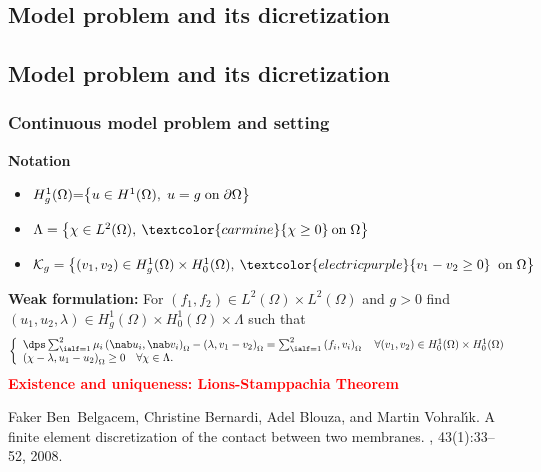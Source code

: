 \documentclass[10 pt]{beamer}
\begin{document}
\begin{frame}
\section{Model problem and its dicretization}
\subsection{Model problem and its dicretization}  
\frametitle{Continuous model problem and setting}
\textbf{Notation}
\begin{itemize}
\item $H_g^1(\Omega)\hspace{-0.1 cm} =\hspace{-0.1 cm} \left\{u\in H^1(\Omega), \hspace{0.1 cm} u=g \hspace{0.1 cm} \mbox{on} \hspace{0.1 cm} \partial \Omega\right\}$
\item $\Lambda=\left\{\chi\in L^2(\Omega), \: \textcolor{carmine}{\chi \geq 0} \: \mbox{on} \hspace{0.1 cm} \Omega\right\}$
\item
$\mathcal{K}_g= \left\{(v_1,v_2)\in H_g^1(\Omega)\times H_0^1(\Omega),\: \textcolor{electricpurple}{v_1-v_2 \geq 0} \; \; \mbox{on} 
\hspace{0.1 cm} \Omega \right\}$
\end{itemize}
\textbf{Weak formulation:}
For $(f_1,f_2)\in L^2(\Omega)\times L^2 (\Omega)$ and $g > 0$ find $(u_1,u_2,\lambda)\in H_g^1(\Omega)\times H_0^1(\Omega) \times \Lambda$ such that
\begin{equation*}
\left\lbrace\begin{array}{llccc}
\dps \sum_{\ialf=1}^2 \mu_i \left(\nab u_i,\nab v_i\right)_{\Omega} - \left(\lambda,v_1-v_2\right)_{\Omega} = \sum_{\ialf=1}^2\left(f_i,v_i\right)_{\Omega} \quad \forall (v_1,v_2) \in H_0^1(\Omega)\times H_0^1(\Omega) \\
\left(\chi - \lambda,u_1-u_2\right)_{\Omega} \geq 0 
\quad \forall \chi \in \Lambda.
\end{array}
\right.
\label{eq:formulation_variationnelle_probleme_initial}
\end{equation*}
\textcolor{red}{\textbf{Existence and uniqueness: Lions-Stamppachia Theorem}}
\scriptsize
\begin{thebibliography}{10}
Faker Ben~Belgacem, Christine Bernardi, Adel Blouza, and Martin
  Vohral{\'{\i}}k.
\newblock A finite element discretization of the contact between two membranes.
, 43(1):33--52, 2008.
\end{thebibliography}
\end{frame}
\end{document}
